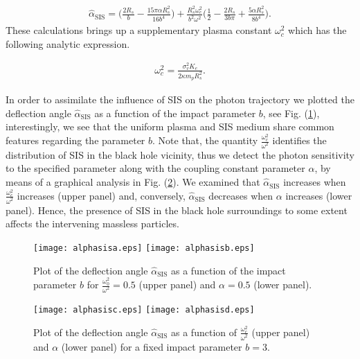 \documentclass[final,5p,times,twocolumn,unknownkeysallowed]{elsarticle}
\begin{document}
\begin{align}
\hat{\alpha}_\mathrm{SIS}=\Bigg(\frac{2R_s}{b}-\frac{15\pi \alpha R^2_s}{16b^4}\Bigg)+\frac{R^2_s\omega^2_c}{b^2\omega^2}
\Bigg(\frac{1}{2}-\frac{2R_s}{3b\pi}+\frac{5\alpha R^2_s}{8b^4}\Bigg). \label{alphasis}
\end{align}
These calculations brings up a supplementary plasma constant $\omega^2_c$ which has the following analytic expression.

\begin{align}
\omega^2_c=\frac{\sigma^2_{v} K_e}{2\kappa m_p R^2_s}.
\end{align}

In order to assimilate the influence of SIS on the photon trajectory we plotted
the deflection angle $\hat{\alpha}_{\mathrm{SIS}}$ as a function of the impact parameter $b$, see Fig. (\ref{anglesis1}),
interestingly, we see that the uniform plasma and SIS medium share common features regarding the parameter $b$.
Note that, the quantity $\frac{\omega^2_{c}}{\omega^2}$ identifies the distribution of SIS in the black hole vicinity,
thus we detect the photon sensitivity to the specified parameter along with the coupling constant parameter $\alpha$, by means of a graphical analysis in Fig. (\ref{anglesis2}). We examined that $\hat{\alpha}_{\mathrm{SIS}}$ increases when $\frac{\omega^2_{c}}{\omega^2}$ increases (upper panel) and, conversely, $\hat{\alpha}_{\mathrm{SIS}}$ decreases when $\alpha$ increases (lower panel). Hence,
the presence of SIS in the black hole surroundings to some extent affects the intervening massless particles.

\begin{figure}[h!]
 \begin{center}
   \texttt{[image: alphasisa.eps]}
   \texttt{[image: alphasisb.eps]}
  \end{center}
\caption{Plot of the deflection angle $\hat{\alpha}_\mathrm{SIS}$ as a function of the impact
parameter $b$ for $\frac{\omega^2_{0}}{\omega^2}=0.5$ (upper panel) and $\alpha=0.5$ (lower panel).}\label{anglesis1}
\end{figure}

\begin{figure}[h!]
 \begin{center}
   \texttt{[image: alphasisc.eps]}
   \texttt{[image: alphasisd.eps]}
  \end{center}
\caption{Plot of the deflection angle $\hat{\alpha}_\mathrm{SIS}$ as a function of $\frac{\omega^2_{c}}{\omega^2}$ (upper panel) and $\alpha$ (lower panel)
for a fixed impact parameter $b=3$.}\label{anglesis2}
\end{figure}
\end{document}
